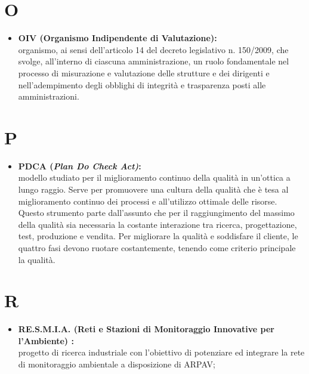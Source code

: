 \documentclass[11pt]{book}              %
\begin{document}
\section*{O}

\begin{itemize}

	\item \textbf{{\color{OliveGreen}OIV} (Organismo Indipendente di Valutazione):} \\	organismo, ai sensi dell'articolo 14 del decreto legislativo n. 150/2009, che svolge, all'interno di ciascuna amministrazione, un ruolo fondamentale nel processo di misurazione e valutazione delle strutture e dei dirigenti e nell'adempimento degli obblighi di integrità e trasparenza posti alle amministrazioni.
	
\end{itemize}

\section*{P}

\begin{itemize}
\item \textbf{{\color{OliveGreen}PDCA} (\textit{Plan Do Check Act)}:} \\
modello studiato per il miglioramento continuo della qualità in un'ottica a lungo raggio. Serve per promuovere una cultura della qualità che è tesa al miglioramento continuo dei processi e all'utilizzo ottimale delle risorse. Questo strumento parte dall'assunto che per il raggiungimento del massimo della qualità sia necessaria la costante interazione tra ricerca, progettazione, test, produzione e vendita. Per migliorare la qualità e soddisfare il cliente, le quattro fasi devono ruotare costantemente, tenendo come criterio principale la qualità.

\end{itemize}

\section*{R}
\begin{itemize}

\item \textbf{{\color{OliveGreen}RE.S.M.I.A.} (Reti e Stazioni di Monitoraggio Innovative per l'Ambiente) :}\\
progetto di ricerca industriale con l'obiettivo di potenziare ed integrare la rete di monitoraggio ambientale a disposizione di ARPAV;

\end{itemize}
\end{document}
